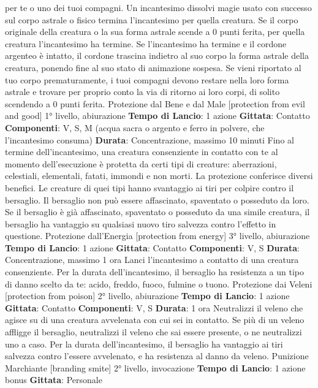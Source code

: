 \begin{multicols}{2}
per te o uno dei tuoi compagni. Un incantesimo dissolvi
magie usato con successo sul corpo astrale o fisico
termina l’incantesimo per quella creatura. Se il corpo
originale della creatura o la sua forma astrale scende a
0 punti ferita, per quella creatura l’incantesimo ha
termine. Se l’incantesimo ha termine e il cordone
argenteo è intatto, il cordone trascina indietro al suo
corpo la forma astrale della creatura, ponendo fine al
suo stato di animazione sospesa.
Se vieni riportato al tuo corpo prematuramente, i tuoi
compagni devono restare nella loro forma astrale e
trovare per proprio conto la via di ritorno ai loro corpi, di
solito scendendo a 0 punti ferita.
Protezione dal Bene e dal Male
[protection from evil and good]
1° livello, abiurazione
\textbf{Tempo di Lancio}: 1 azione
\textbf{Gittata}: Contatto
\textbf{Componenti}: V, S, M (acqua sacra o argento e ferro in
polvere, che l’incantesimo consuma)
\textbf{Durata}: Concentrazione, massimo 10 minuti
Fino al termine dell’incantesimo, una creatura
consenziente in contatto con te al momento
dell’esecuzione è protetta da certi tipi di creature:
aberrazioni, celestiali, elementali, fatati, immondi e non
morti.
La protezione conferisce diversi benefici. Le creature di
quei tipi hanno svantaggio ai tiri per colpire contro il
bersaglio. Il bersaglio non può essere affascinato,
spaventato o posseduto da loro. Se il bersaglio è già
affascinato, spaventato o posseduto da una simile
creatura, il bersaglio ha vantaggio su qualsiasi nuovo
tiro salvezza contro l’effetto in questione.
Protezione dall’Energia
[protection from energy]
3° livello, abiurazione
\textbf{Tempo di Lancio}: 1 azione
\textbf{Gittata}: Contatto
\textbf{Componenti}: V, S
\textbf{Durata}: Concentrazione, massimo 1 ora
Lanci l’incantesimo a contatto di una creatura
consenziente. Per la durata dell’incantesimo, il
bersaglio ha resistenza a un tipo di danno scelto da te:
acido, freddo, fuoco, fulmine o tuono.
Protezione dai Veleni
[protection from poison]
2° livello, abiurazione
\textbf{Tempo di Lancio}: 1 azione
\textbf{Gittata}: Contatto
\textbf{Componenti}: V, S
\textbf{Durata}: 1 ora
Neutralizzi il veleno che agisce su di una creatura
avvelenata con cui sei in contatto. Se più di un veleno
affligge il bersaglio, neutralizzi il veleno che sai essere
presente, o ne neutralizzi uno a caso.
Per la durata dell’incantesimo, il bersaglio ha vantaggio
ai tiri salvezza contro l’essere avvelenato, e ha
resistenza al danno da veleno.
Punizione Marchiante
[branding smite]
2° livello, invocazione
\textbf{Tempo di Lancio}: 1 azione bonus
\textbf{Gittata}: Personale

\end{multicols}
